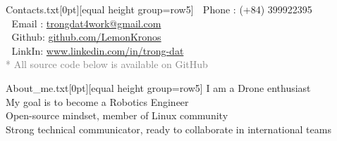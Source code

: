 \begin{twmnotebook}{Contacts.txt}[0pt][equal height group=row5]
{\Large } \quad Phone : (+84) 399922395\\
{\Large } \quad Email : \href{mailto:trongdat4work@gmail.com}{\textcolor{link}{trongdat4work@gmail.com}}\\
{\Large } \quad Github: \href{https://github.com/LemonKronos}{\textcolor{link}{github.com/LemonKronos}}\\
{\Large } \quad LinkIn: \href{https://www.linkedin.com/in/trong-dat}{\textcolor{link}{www.linkedin.com/in/trong-dat}}\\
\textcolor{gray}{* All source code below is available on GitHub}
\end{twmnotebook}%
\twmgap%
\begin{twmnotebook}{About\_me.txt}[0pt][equal height group=row5]
\textbullet \quad I am a \textcolor{chillblue}{Drone enthusiast}\\
\textbullet \quad My goal is to become a Robotics Engineer\\
\textbullet \quad Open-source mindset, member of Linux community\\
\textbullet \quad Strong technical communicator, ready to collaborate in international teams\\
\end{twmnotebook}